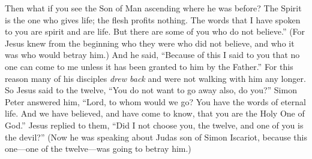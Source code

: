 \begin{biblechapter}
\verse Then what if you see the Son of Man ascending where he was before?
\verse The Spirit is the one who gives life; the flesh profits nothing. The words that I have spoken to you are spirit and are life.
\verse But there are some of you who do not believe.” (For Jesus knew from the beginning who they were who did not believe, and who it was who would betray him.)
\verse And he said, “Because of this I said to you that no one can come to me unless it has been granted to him by the Father.”
 For this reason many of his disciples \textit{drew back} and were not walking with him any longer.
\verse So Jesus said to the twelve, “You do not want to go away also, do you?”
\verse Simon Peter answered him, “Lord, to whom would we go? You have the words of eternal life.
\verse And we have believed, and have come to know, that you are the Holy One of God.”
\verse Jesus replied to them, “Did I not choose you, the twelve, and one of you is the devil?”
\verse (Now he was speaking about Judas son of Simon Iscariot, because this one—one of the twelve—was going to betray him.)
\end{biblechapter}

